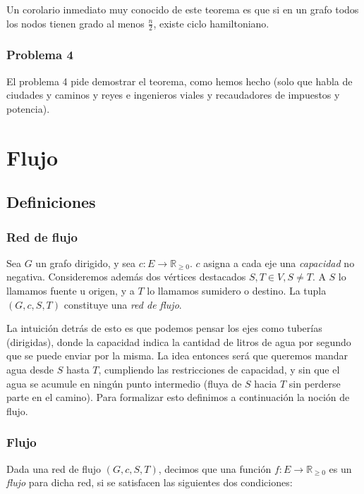 \documentclass{article}
\begin{document}
Un corolario inmediato muy conocido de este teorema es que si en un grafo todos los nodos tienen grado al menos $\frac{n}{2}$, existe
ciclo hamiltoniano.

\subsubsection{Problema 4}

El problema 4 pide demostrar el teorema, como hemos hecho (solo que habla de ciudades y caminos y reyes e ingenieros viales y recaudadores de impuestos y potencia).

\pagebreak

\section{Flujo}

\subsection{Definiciones}

\subsubsection{Red de flujo}

Sea $G$ un grafo dirigido, y sea $c : E \rightarrow \mathbb{R}_{\geq 0}$. $c$ asigna a cada eje una \textit{capacidad} no negativa. Consideremos
además dos vértices destacados $S,T \in V, S \neq T$. A $S$ lo llamamos fuente u origen, y a $T$ lo llamamos sumidero o destino. La tupla
$(G,c,S,T)$ constituye una \textit{red de flujo}.

La intuición detrás de esto es que podemos pensar los ejes como tuberías (dirigidas), donde la capacidad indica la cantidad de litros de agua
por segundo que se puede enviar por la misma. La idea entonces será que queremos mandar agua desde $S$ hasta $T$, cumpliendo las restricciones
de capacidad, y sin que el agua se acumule en ningún punto intermedio (fluya de $S$ hacia $T$ sin perderse parte en el camino). Para formalizar
esto definimos a continuación la noción de flujo.

\subsubsection{Flujo}

Dada una red de flujo $(G,c,S,T)$, decimos que una función $f : E \rightarrow \mathbb{R}_{\geq 0}$ es un \textit{flujo} para dicha red,
si se satisfacen las siguientes dos condiciones:
\end{document}
